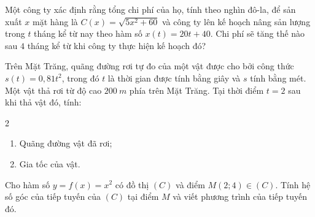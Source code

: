 \begin{bt}%

	Một công ty xác định rằng tổng chi phí của họ, tính theo nghìn đô-la, để sản xuất $x$ mặt hàng là $C(x)=\sqrt{5x^2+60}$ và công ty lên kế hoạch nâng sản lượng trong $t$ tháng kể từ nay theo hàm số $x(t)=20t+40$. Chi phí sẽ tăng thế nào sau $4$ tháng kể từ khi công ty thực hiện kế hoạch đó?
\end{bt}

\begin{bt}%

	Trên Mặt Trăng, quãng đường rơi tự đo của một vật được cho bởi công thức $s(t)=0,81t^2$, trong đó $t$ là thời gian được tính bằng giây và $s$ tính bằng mét. Một vật thả rơi từ độ cao $200~m$  phía trên Mặt Trăng. Tại thời điểm $t=2$ sau khi thả vật đó, tính:
	\begin{multicols}{2}
		\begin{enumerate}
			\item Quãng đường vật đã rơi;
			\item Gia tốc của vật.
		\end{enumerate}
	\end{multicols}	
\end{bt}

\begin{bt}%

	Cho hàm số $y=f(x)=x^2$ có đồ thị $(C)$ và điểm $M(2 ; 4) \in(C)$. Tính hệ số góc của tiếp tuyến của $(C)$ tại điểm $M$ và viết phương trình của tiếp tuyến đó.
\end{bt}

